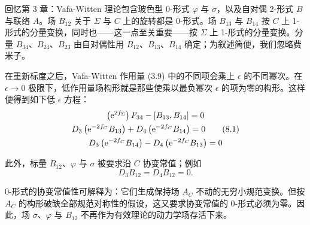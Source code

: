 回忆第 3 章：Vafa-Witten 理论包含玻色型 0-形式 $\varphi$ 与 $\sigma$，以及自对偶 2-形式 $B$ 与联络 $A$。场 $B_{12}$ 关于 $\Sigma$ 与 $C$ 上的旋转都是 0-形式。场 $B_{13}$ 与 $B_{14}$ 按 $C$ 上 1-形式的分量变换，同时也——这一点至关重要——按 $\Sigma$ 上 1-形式的分量变换。分量 $B_{34}$、$B_{24}$、$B_{23}$ 由自对偶性用 $B_{12}$、$B_{13}$、$B_{14}$ 确定；为叙述简便，我们忽略费米子。

在重新标度之后，Vafa-Witten 作用量 (3.9) 中的不同项会乘上 $\epsilon$ 的不同幂次。在 $\epsilon\to 0$ 极限下，低作用量场构形就是那些使乘以最负幂次 $\epsilon$ 的项为零的构形。这样便得到如下低 $\epsilon$ 方程：
\begin{gather}
\left(\mathrm{e}^{2f_\Sigma}\right)F_{34}-[B_{13},B_{14}]=0 \notag\\
D_3\left(\mathrm{e}^{-2f_C}B_{13}\right)+D_4\left(\mathrm{e}^{-2f_C}B_{14}\right)=0 \tag{8.1}\\
D_3\left(\mathrm{e}^{-2f_C}B_{14}\right)-D_4\left(\mathrm{e}^{-2f_C}B_{13}\right)=0 \notag
\end{gather}

此外，标量 $B_{12}$、$\varphi$ 与 $\sigma$ 被要求沿 $C$ 协变常值；例如
\[
D_3B_{12}=D_4B_{12}=0 .
\]

0-形式的协变常值性可解释为：它们生成保持场 $A_C$ 不动的无穷小规范变换。但按 $A_C$ 的构形破缺全部规范对称性的假设，这又要求协变常值的 0-形式必须为零。因此，场 $\sigma$、$\varphi$ 与 $B_{12}$ 不再作为有效理论的动力学场存活下来。

